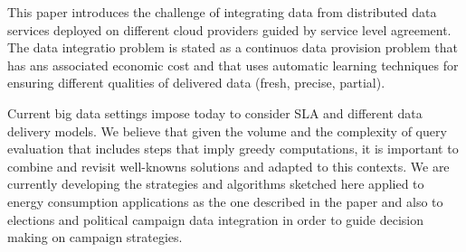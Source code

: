 This paper introduces the challenge of integrating data from distributed data services deployed on different cloud providers guided by service level agreement. The data integratio problem is stated as a continuos data provision problem that has ans associated economic cost and that uses automatic learning techniques for ensuring different qualities of delivered data (fresh, precise, partial).

Current big data settings impose today to consider SLA and different data delivery models. We believe that given the volume and the complexity of query evaluation that includes steps that imply greedy computations, it is important to combine and revisit well-knowns solutions and adapted to this contexts. We are currently developing the strategies and algorithms sketched here applied to energy consumption applications as the one described in the paper and also to elections and political campaign data integration in order to guide decision making on campaign strategies.
